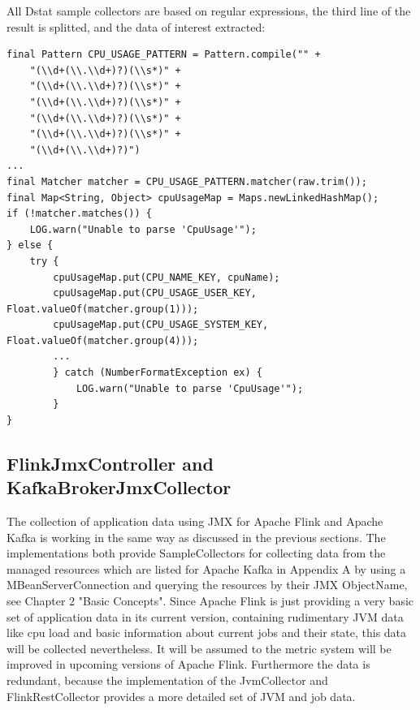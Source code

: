 All Dstat sample collectors are based on regular expressions, the third line of the result is splitted, and the data of interest
extracted:
\begin{lstlisting}[caption={"CpuSampleCollector", Extract sample data}, captionpos=b, label={lst:cpusamplecollector}]
final Pattern CPU_USAGE_PATTERN = Pattern.compile("" +
    "(\\d+(\\.\\d+)?)(\\s*)" +
    "(\\d+(\\.\\d+)?)(\\s*)" +
    "(\\d+(\\.\\d+)?)(\\s*)" +
    "(\\d+(\\.\\d+)?)(\\s*)" +
    "(\\d+(\\.\\d+)?)(\\s*)" +
    "(\\d+(\\.\\d+)?)")
...
final Matcher matcher = CPU_USAGE_PATTERN.matcher(raw.trim());
final Map<String, Object> cpuUsageMap = Maps.newLinkedHashMap();
if (!matcher.matches()) {
    LOG.warn("Unable to parse 'CpuUsage'");
} else {
    try {
        cpuUsageMap.put(CPU_NAME_KEY, cpuName);
        cpuUsageMap.put(CPU_USAGE_USER_KEY, Float.valueOf(matcher.group(1)));
        cpuUsageMap.put(CPU_USAGE_SYSTEM_KEY, Float.valueOf(matcher.group(4)));
        ...
        } catch (NumberFormatException ex) {
            LOG.warn("Unable to parse 'CpuUsage'");
        }
}
\end{lstlisting}

\subsection{FlinkJmxController and KafkaBrokerJmxCollector}

The collection of application data using JMX for Apache Flink and Apache Kafka is working in the
same way as discussed in the previous sections. The implementations both provide SampleCollectors for collecting data
from the managed resources which are listed for Apache Kafka in Appendix A by using a MBeanServerConnection and querying the resources by their JMX ObjectName,
see Chapter 2 "Basic Concepts". Since Apache Flink is just providing a very basic set
of application data in its current version, containing rudimentary JVM data like cpu load and basic information about current
jobs and their state, this data will be collected nevertheless. It will be assumed to the metric system will be improved in upcoming versions
of Apache Flink. Furthermore the data is redundant, because the implementation of the JvmCollector and FlinkRestCollector provides a
more detailed set of JVM and job data.

